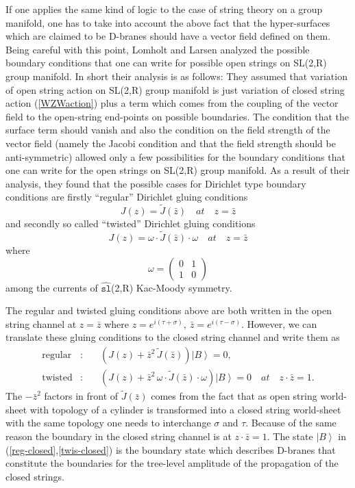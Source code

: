 \documentclass[a4paper,12pt]{article}
\begin{document}
If one applies the same kind of logic to the case of string theory on a
group manifold, one has to take into account the above fact that the
hyper-surfaces which are claimed to be D-branes should have a vector field
defined on them. Being careful with this point, Lomholt and Larsen \cite
{lomholt} analyzed the possible boundary conditions that one can write for
possible open strings on SL(2,R) group manifold. In short their analysis is
as follows: They assumed that variation of open string action on SL(2,R)
group manifold is just variation of closed string action (\ref{WZWaction})
plus a term which comes from the coupling of the vector field to the
open-string end-points on possible boundaries. The condition that the
surface term should vanish and also the condition on the field strength of
the vector field (namely the Jacobi condition and that the field strength
should be anti-symmetric) allowed only a few possibilities for the boundary
conditions that one can write for the open strings on SL(2,R) group
manifold. As a result of their analysis, they found that the possible cases
for Dirichlet type boundary conditions are firstly ``regular'' Dirichlet
gluing conditions
\begin{equation}
J\left( z\right) =\tilde{J}\left( \bar{z}\right) \quad at\quad z=\bar{z}
\label{regular}
\end{equation}
and secondly so called ``twisted'' Dirichlet gluing conditions
\begin{equation}
J\left( z\right) =\omega \cdot \tilde{J}\left( \bar{z}\right) \cdot \omega
\quad at\quad z=\bar{z}  \label{twisted}
\end{equation}
where
\[
\omega =\left(
\begin{array}{cc}
0 & 1 \\
1 & 0
\end{array}
\right)
\]
among the currents of $\widehat{\mathtt{sl}}$(2,R) Kac-Moody symmetry.

The regular and twisted gluing conditions above are both written in the open
string channel at $z=\bar{z}$ where $z=e^{i(\tau +\sigma )},\ \bar{z}%
=e^{i(\tau -\sigma )}$. However, we can translate these gluing conditions to
the closed string channel and write them as
\begin{eqnarray}
\mathrm{regular} &:&\quad \left( J(z)+\bar{z}^{2}\,\tilde{J}\left( \bar{z}%
\right) \right) \left| B\right\rangle =0,  \label{reg-closed} \\
\mathrm{twisted} &:&\quad \left( J(z)+\bar{z}^{2}\,\omega \cdot \tilde{J}%
\left( \bar{z}\right) \cdot \omega \right) \left| B\right\rangle =0\quad
at\quad z\cdot \bar{z}=1.  \label{twis-closed}
\end{eqnarray}
The $-\bar{z}^{2}$ factors in front of $\tilde{J}\left( \bar{z}\right) $
comes from the fact that as open string world-sheet with topology of a
cylinder is transformed into a closed string world-sheet with the same
topology one needs to interchange $\sigma $ and $\tau $. Because of the same
reason the boundary in the closed string channel is at $z\cdot \bar{z}=1$.
The state $\left| B\right\rangle $ in (\ref{reg-closed},\ref{twis-closed})
is the boundary state which describes D-branes that constitute the
boundaries for the tree-level amplitude of the propagation of the closed
strings.
\end{document}
